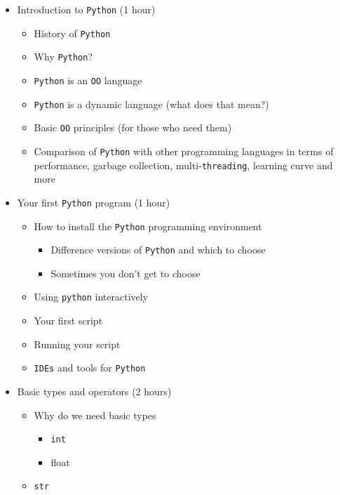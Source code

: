 \documentclass[
]{article}
\providecommand{\tightlist}{%
  \setlength{\itemsep}{0pt}\setlength{\parskip}{0pt}}
\begin{document}
\begin{itemize}
\tightlist
\item
  Introduction to \texttt{Python} (1 hour)

  \begin{itemize}
  \tightlist
  \item
    History of \texttt{Python}
  \item
    Why \texttt{Python}?
  \item
    \texttt{Python} is an \texttt{OO} language
  \item
    \texttt{Python} is a dynamic language (what does that mean?)
  \item
    Basic \texttt{OO} principles (for those who need them)
  \item
    Comparison of \texttt{Python} with other programming languages in
    terms of performance, garbage collection, multi-\texttt{threading},
    learning curve and more
  \end{itemize}
\item
  Your first \texttt{Python} program (1 hour)

  \begin{itemize}
  \tightlist
  \item
    How to install the \texttt{Python} programming environment

    \begin{itemize}
    \tightlist
    \item
      Difference versions of \texttt{Python} and which to choose
    \item
      Sometimes you don't get to choose
    \end{itemize}
  \item
    Using \texttt{python} interactively
  \item
    Your first script
  \item
    Running your script
  \item
    \texttt{IDEs} and tools for \texttt{Python}
  \end{itemize}
\item
  Basic types and operators (2 hours)

  \begin{itemize}
  \tightlist
  \item
    Why do we need basic types

    \begin{itemize}
    \tightlist
    \item
      \texttt{int}
    \item
      float
    \end{itemize}
  \item
    \texttt{str}


\end{itemize}
\end{itemize}
\end{document}
